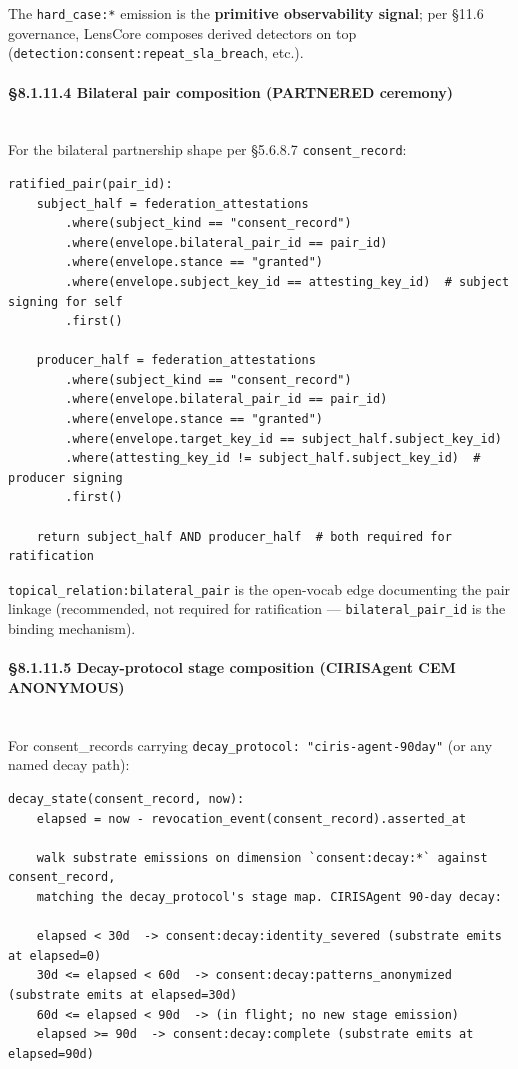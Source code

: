 \documentclass[11pt]{article}
\begin{document}
The \texttt{hard\_case:*} emission is the \textbf{primitive observability signal}; per §11.6 governance, LensCore composes derived detectors on top (\texttt{detection:consent:repeat\_sla\_breach}, etc.).


\paragraph{§8.1.11.4 Bilateral pair composition (PARTNERED ceremony)}\mbox{}\\


For the bilateral partnership shape per §5.6.8.7 \texttt{consent\_record}:


\begin{lstlisting}
ratified_pair(pair_id):
    subject_half = federation_attestations
        .where(subject_kind == "consent_record")
        .where(envelope.bilateral_pair_id == pair_id)
        .where(envelope.stance == "granted")
        .where(envelope.subject_key_id == attesting_key_id)  # subject signing for self
        .first()

    producer_half = federation_attestations
        .where(subject_kind == "consent_record")
        .where(envelope.bilateral_pair_id == pair_id)
        .where(envelope.stance == "granted")
        .where(envelope.target_key_id == subject_half.subject_key_id)
        .where(attesting_key_id != subject_half.subject_key_id)  # producer signing
        .first()

    return subject_half AND producer_half  # both required for ratification
\end{lstlisting}

\texttt{topical\_relation:bilateral\_pair} is the open-vocab edge documenting the pair linkage (recommended, not required for ratification — \texttt{bilateral\_pair\_id} is the binding mechanism).


\paragraph{§8.1.11.5 Decay-protocol stage composition (CIRISAgent CEM ANONYMOUS)}\mbox{}\\


For consent\_records carrying \texttt{decay\_protocol: "ciris-agent-90day"} (or any named decay path):


\begin{lstlisting}
decay_state(consent_record, now):
    elapsed = now - revocation_event(consent_record).asserted_at

    walk substrate emissions on dimension `consent:decay:*` against consent_record,
    matching the decay_protocol's stage map. CIRISAgent 90-day decay:

    elapsed < 30d  -> consent:decay:identity_severed (substrate emits at elapsed=0)
    30d <= elapsed < 60d  -> consent:decay:patterns_anonymized (substrate emits at elapsed=30d)
    60d <= elapsed < 90d  -> (in flight; no new stage emission)
    elapsed >= 90d  -> consent:decay:complete (substrate emits at elapsed=90d)
\end{lstlisting}
\end{document}
